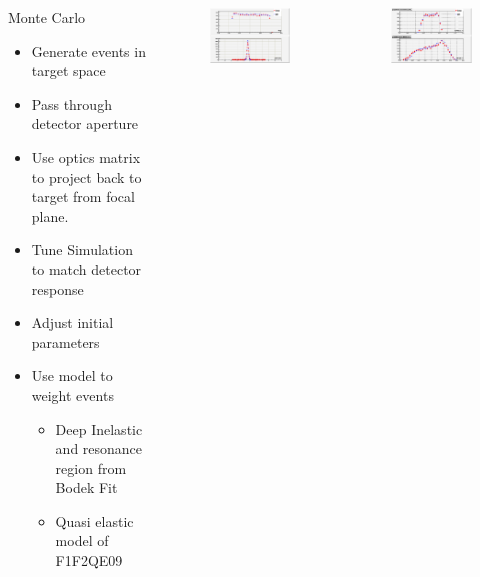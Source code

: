 \documentclass{beamer}
\begin{document}
\begin{frame}{}
\begin{columns}
		\begin{block}{Monte Carlo}
			\begin{itemize}
				\item Generate events in target space
				\item Pass through detector aperture
				\item Use optics matrix to project back to target from focal plane.
				\item Tune Simulation to match detector response
				\item Adjust initial parameters
				\item Use model to weight events
				\begin{itemize}
					\item Deep Inelastic and resonance region from Bodek Fit  \cite{bodek}
					\item Quasi elastic model of F1F2QE09 \cite{F1F}
				\end{itemize}    
			\end{itemize}
		\end{block}
	\vspace{-20pt}
	\begin{figure}
		\includegraphics[width=6cm]{../images/dp_ytar_1207.png}
	\end{figure}
	\vspace{-30pt}
	\begin{figure}
		\includegraphics[width=6cm]{../images/xp_yp_foc_1207.png}
	\end{figure}
\end{columns}
\end{frame}
\end{document}
